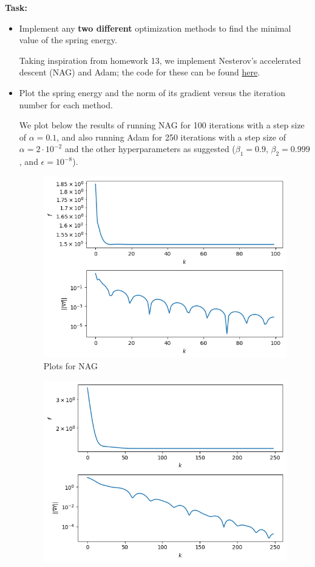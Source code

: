 \documentclass{../kin_math}
\begin{document}
\begin{questions}
  \textbf{Task:}
  \begin{itemize}
    \item Implement any \textbf{two different} optimization methods to find the minimal value of the spring energy.
    \begin{solution}
      Taking inspiration from homework 13, we implement Nesterov's accelerated descent (NAG) and Adam; the code for these can be found \href{https://github.com/elijahkin/amsc660/blob/main/final/final.ipynb}{here}.
    \end{solution}
    \item Plot the spring energy and the norm of its gradient versus the iteration number for each method.
    \begin{solution}
      We plot below the results of running NAG for 100 iterations with a step size of $\alpha = 0.1$, and also running Adam for 250 iterations with a step size of $\alpha = 2 \cdot 10^{-2}$ and the other hyperparameters as suggested ($\beta_1 = 0.9$, $\beta_2 = 0.999$, and $\epsilon = 10^{-8}$).
      \begin{figure}
        \centering
        \includegraphics[scale=0.47]{nest_plots.png}
        \caption{Plots for NAG}
      \end{figure}
      \begin{figure}
        \centering
        \includegraphics[scale=0.47]{adam_plots.png}

\end{figure}
\end{solution}
\end{itemize}
\end{questions}
\end{document}
